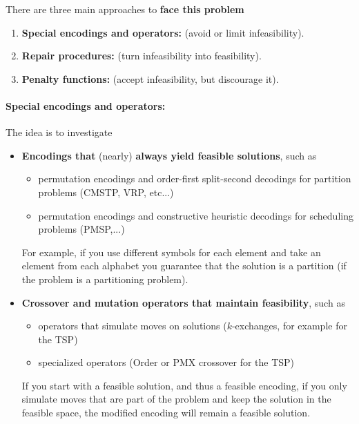 There are three main approaches to \textbf{face this problem}
\begin{enumerate}
	\item \textbf{Special encodings and operators:} (avoid or limit infeasibility).\\
	
	\item \textbf{Repair procedures:} (turn infeasibility into feasibility).\\
	
	\item \textbf{Penalty functions:} (accept infeasibility, but discourage it).\\
\end{enumerate}

\newpage

\paragraph{Special encodings and operators:} The idea is to investigate
\begin{itemize}
	\item \textbf{Encodings that} (nearly) \textbf{always yield feasible solutions}, such as
	\begin{itemize}
		\item permutation encodings and order-first split-second decodings for partition problems (CMSTP, VRP, etc...)
		\item permutation encodings and constructive heuristic decodings for scheduling problems (PMSP,...)
	\end{itemize}
	For example, if you use different symbols for each element and take an element from each alphabet you guarantee that the solution is a partition (if the problem is a partitioning problem).\\
	
	\item \textbf{Crossover and mutation operators that maintain feasibility}, such as
	\begin{itemize}
		\item operators that simulate moves on solutions ($k$-exchanges, for example for the TSP)
		\item specialized operators (Order or PMX crossover for the TSP)
	\end{itemize}
	If you start with a feasible solution, and thus a feasible encoding, if you only simulate moves that are part of the problem and keep the solution in the feasible space, the modified encoding will remain a feasible solution.\\
\end{itemize}

